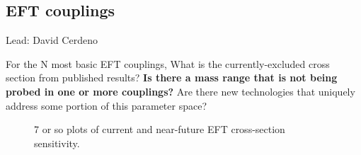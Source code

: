 \subsection{EFT couplings}
Lead: David Cerdeno

For the N most basic EFT couplings, What is the currently-excluded cross section from published results?  \textbf{Is there a mass range that is not being probed in one or more couplings?} Are there new technologies that uniquely address some portion of this parameter space?

\begin{figure}
    \centering
    \caption{7 or so plots of current and near-future EFT cross-section sensitivity.}
    \label{fig:EFT_sensitivity}
\end{figure}



